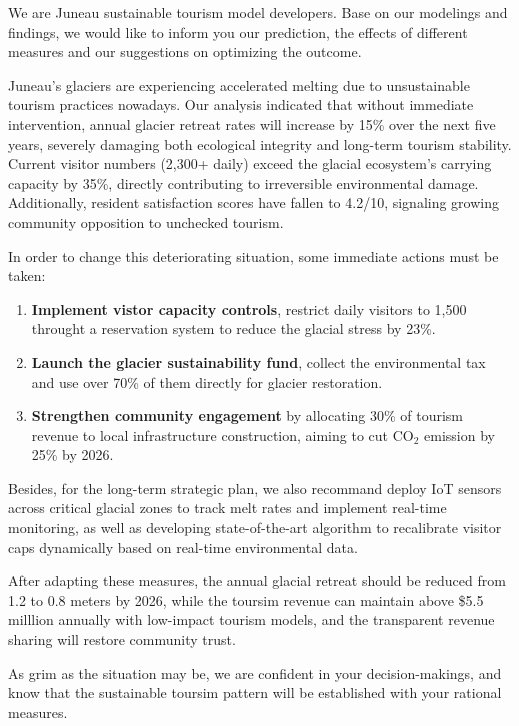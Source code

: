 \documentclass{mcmthesis}
\begin{document}
\memodate{\today}
\begin{memo}[Memorandum]
  We are Juneau sustainable tourism model developers. Base on our modelings and findings, we would like
  to inform you our prediction, the effects of different measures and our suggestions on optimizing the outcome.

  Juneau's glaciers are experiencing accelerated melting due to unsustainable tourism practices nowadays. 
  Our analysis indicated that without immediate intervention, annual glacier retreat rates will increase by 15\%
  over the next five years, severely damaging both ecological integrity and long-term tourism stability. 
  Current visitor numbers (2,300+ daily) exceed the glacial ecosystem's carrying capacity by 35\%, directly contributing to irreversible environmental damage. 
  Additionally, resident satisfaction scores have fallen to 4.2/10, signaling growing community opposition to unchecked tourism.

  In order to change this deteriorating situation, some immediate actions must be taken:
  \begin{enumerate}
    \item \textbf{Implement vistor capacity controls}, restrict daily visitors to 1,500 throught a reservation system to reduce the glacial stress by 23\%.
    \item \textbf{Launch the glacier sustainability fund}, collect the environmental tax and use over 70\% of them directly for glacier restoration.
    \item \textbf{Strengthen community engagement} by allocating 30\% of tourism revenue to local infrastructure construction, aiming to cut $\text{CO}_\text{2}$ emission by 25\% by 2026.
  \end{enumerate}

  Besides, for the long-term strategic plan, we also recommand deploy IoT sensors across critical glacial zones to track melt rates and implement real-time monitoring, as well as
  developing state-of-the-art algorithm to recalibrate visitor caps dynamically based on real-time environmental data.

  After adapting these measures, the annual glacial retreat should be reduced from 1.2 to 0.8 meters by 2026, while the toursim revenue can maintain above \$5.5 milllion annually with
  low-impact tourism models, and the transparent revenue sharing will restore community trust.

  As grim as the situation may be, we are confident in your decision-makings, and know that the sustainable toursim pattern will be established
  with your rational measures.
\end{memo}
\end{document}
